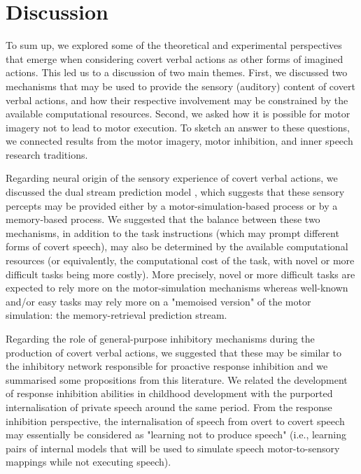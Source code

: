 \documentclass[utf8]{template/frontiersSCNS} %
\begin{document}
\section{Discussion}


To sum up, we explored some of the theoretical and experimental perspectives that emerge when considering covert verbal actions as other forms of imagined actions. This led us to a discussion of two main themes. First, we discussed two mechanisms that may be used to provide the sensory (auditory) content of covert verbal actions, and how their respective involvement may be constrained by the available computational resources. Second, we asked how it is possible for motor imagery not to lead to motor execution. To sketch an answer to these questions, we connected results from the motor imagery, motor inhibition, and inner speech research traditions.

Regarding neural origin of the sensory experience of covert verbal actions, we discussed the dual stream prediction model \citep{tian_mental_2012, tian_effect_2013, tian_mental_2016}, which suggests that these sensory percepts may be provided either by a motor-simulation-based process or by a memory-based process. We suggested that the balance between these two mechanisms, in addition to the task instructions (which may prompt different forms of covert speech), may also be determined by the available computational resources (or equivalently, the computational cost of the task, with novel or more difficult tasks being more costly). More precisely, novel or more difficult tasks are expected to rely more on the motor-simulation mechanisms whereas well-known and/or easy tasks may rely more on a "memoised version" of the motor simulation: the memory-retrieval prediction stream.

Regarding the role of general-purpose inhibitory mechanisms during the production of covert verbal actions, we suggested that these may be similar to the inhibitory network responsible for proactive response inhibition and we summarised some propositions from this literature. We related the development of response inhibition abilities in childhood development with the purported internalisation of private speech around the same period. From the response inhibition perspective, the internalisation of speech from overt to covert speech may essentially be considered as "learning not to produce speech" (i.e., learning pairs of internal models that will be used to simulate speech motor-to-sensory mappings while not executing speech).
\end{document}
